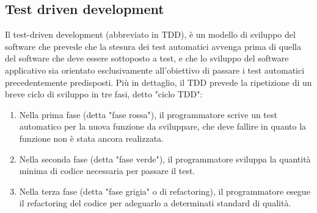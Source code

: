 \documentclass[10pt, a4paper]{article}
\begin{document}
\subsection{Test driven development}
Il test-driven development (abbreviato in TDD), è un modello di sviluppo del software che prevede
che la stesura dei test automatici avvenga prima di quella del software che deve essere sottoposto
a test, e che lo sviluppo del software applicativo sia orientato esclusivamente all'obiettivo di
passare i test automatici precedentemente predisposti.
Più in dettaglio, il TDD prevede la ripetizione di un breve ciclo di sviluppo in tre fasi, detto "ciclo TDD":
\begin{enumerate}
\item Nella prima fase (detta "fase rossa"), il programmatore scrive un test automatico per la nuova
funzione da sviluppare, che deve fallire in quanto la funzione non è stata ancora realizzata.
\item Nella seconda fase (detta "fase verde"), il programmatore sviluppa la quantità minima di codice
necessaria per passare il test.
\item Nella terza fase (detta "fase grigia" o di refactoring), il programmatore esegue il refactoring del codice per adeguarlo a determinati standard di qualità.
\end{enumerate}
\end{document}
